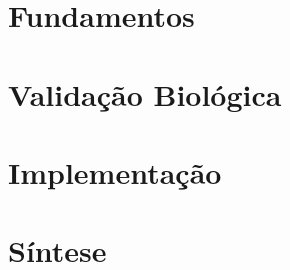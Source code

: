 \documentclass[
    twoside, openright, titlepage,
    numbers=noenddot,
    headinclude, footinclude,
    cleardoublepage=empty,
    paper=a4, fontsize=11pt
]{scrreprt}
\begin{document}
\frenchspacing
\raggedbottom
{}
\pagestyle{plain}



\cleardoublepage
\cleardoublepage
\cleardoublepage
\cleardoublepage
\cleardoublepage
\cleardoublepage
\cleardoublepage

\cleardoublepage
\pagestyle{scrheadings}

\part{Fundamentos}




\part{Validação Biológica}


\part{Implementação}


\part{Síntese}



\cleardoublepage
\cleardoublepage
\end{document}
